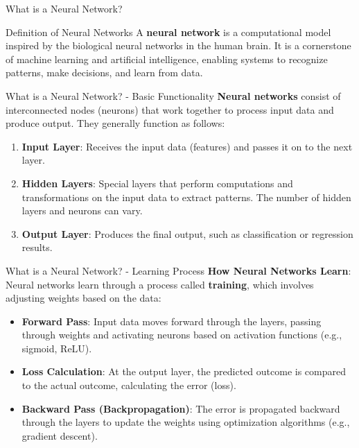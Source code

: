 \documentclass[aspectratio=169]{beamer}
\begin{document}
\begin{frame}[fragile]{What is a Neural Network?}
    \begin{block}{Definition of Neural Networks}
        A \textbf{neural network} is a computational model inspired by the biological neural networks in the human brain. It is a cornerstone of machine learning and artificial intelligence, enabling systems to recognize patterns, make decisions, and learn from data.
    \end{block}
\end{frame}

\begin{frame}[fragile]{What is a Neural Network? - Basic Functionality}
    \textbf{Neural networks} consist of interconnected nodes (neurons) that work together to process input data and produce output. They generally function as follows:

    \begin{enumerate}
        \item \textbf{Input Layer}: Receives the input data (features) and passes it on to the next layer.
        \item \textbf{Hidden Layers}: Special layers that perform computations and transformations on the input data to extract patterns. The number of hidden layers and neurons can vary.
        \item \textbf{Output Layer}: Produces the final output, such as classification or regression results.
    \end{enumerate}
\end{frame}

\begin{frame}[fragile]{What is a Neural Network? - Learning Process}
    \textbf{How Neural Networks Learn}:
    Neural networks learn through a process called \textbf{training}, which involves adjusting weights based on the data:

    \begin{itemize}
        \item \textbf{Forward Pass}: Input data moves forward through the layers, passing through weights and activating neurons based on activation functions (e.g., sigmoid, ReLU).
        \item \textbf{Loss Calculation}: At the output layer, the predicted outcome is compared to the actual outcome, calculating the error (loss).
        \item \textbf{Backward Pass (Backpropagation)}: The error is propagated backward through the layers to update the weights using optimization algorithms (e.g., gradient descent).
    \end{itemize}
\end{frame}
\end{document}
